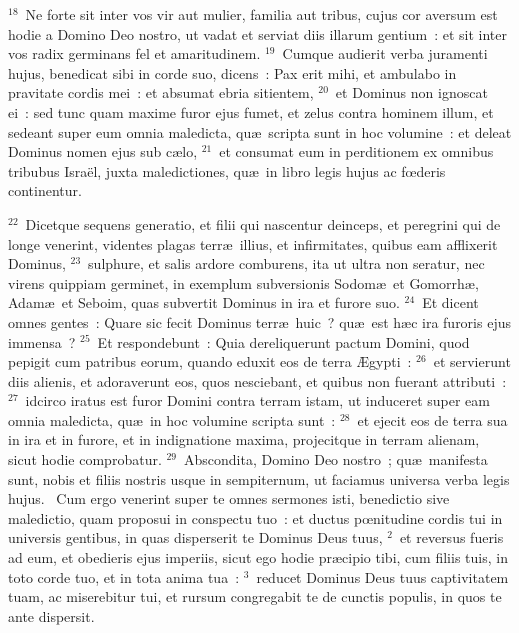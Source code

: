 ${}^{18}$~Ne forte sit inter vos vir aut mulier, familia aut tribus, cujus cor aversum est hodie a Domino Deo nostro, ut vadat et serviat diis illarum gentium~: et sit inter vos radix germinans fel et amaritudinem.
${}^{19}$~Cumque audierit verba juramenti hujus, benedicat sibi in corde suo, dicens~: Pax erit mihi, et ambulabo in pravitate cordis mei~: et absumat ebria sitientem,
${}^{20}$~et Dominus non ignoscat ei~: sed tunc quam maxime furor ejus fumet, et zelus contra hominem illum, et sedeant super eum omnia maledicta, qu\ae\ scripta sunt in hoc volumine~: et deleat Dominus nomen ejus sub c\ae lo,
${}^{21}$~et consumat eum in perditionem ex omnibus tribubus Isra\"el, juxta maledictiones, qu\ae\ in libro legis hujus ac fœderis continentur.


${}^{22}$~Dicetque sequens generatio, et filii qui nascentur deinceps, et peregrini qui de longe venerint, videntes plagas terr\ae\ illius, et infirmitates, quibus eam afflixerit Dominus,
${}^{23}$~sulphure, et salis ardore comburens, ita ut ultra non seratur, nec virens quippiam germinet, in exemplum subversionis Sodom\ae\ et Gomorrh\ae , Adam\ae\ et Seboim, quas subvertit Dominus in ira et furore suo.
${}^{24}$~Et dicent omnes gentes~: Quare sic fecit Dominus terr\ae\ huic~? qu\ae\ est h\ae c ira furoris ejus immensa~?
${}^{25}$~Et respondebunt~: Quia dereliquerunt pactum Domini, quod pepigit cum patribus eorum, quando eduxit eos de terra \AE gypti~:
${}^{26}$~et servierunt diis alienis, et adoraverunt eos, quos nesciebant, et quibus non fuerant attributi~:
${}^{27}$~idcirco iratus est furor Domini contra terram istam, ut induceret super eam omnia maledicta, qu\ae\ in hoc volumine scripta sunt~:
${}^{28}$~et ejecit eos de terra sua in ira et in furore, et in indignatione maxima, projecitque in terram alienam, sicut hodie comprobatur.
${}^{29}$~Abscondita, Domino Deo nostro~; qu\ae\ manifesta sunt, nobis et filiis nostris usque in sempiternum, ut faciamus universa verba legis hujus.
~\lettrine[lines=10,image=true,loversize=0.05,lraise=-0.03]{C}{}um ergo venerint super te omnes sermones isti, benedictio sive maledictio, quam proposui in conspectu tuo~: et ductus pœnitudine cordis tui in universis gentibus, in quas disperserit te Dominus Deus tuus,
${}^{2}$~et reversus fueris ad eum, et obedieris ejus imperiis, sicut ego hodie pr\ae cipio tibi, cum filiis tuis, in toto corde tuo, et in tota anima tua~:
${}^{3}$~reducet Dominus Deus tuus captivitatem tuam, ac miserebitur tui, et rursum congregabit te de cunctis populis, in quos te ante dispersit.
